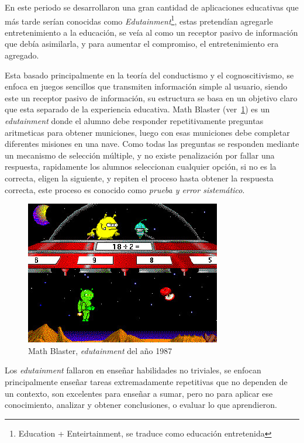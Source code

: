 En este periodo se desarrollaron una gran cantidad de aplicaciones educativas
que más tarde serían conocidas como \emph{Edutainment}\footnote{Education +
	Enteirtainment, se traduce como educación entretenida}, estas pretendían
agregarle entretenimiento a la educación, se veía al como un receptor pasivo de
información que debía asimilarla, y para aumentar el compromiso, el
entretenimiento era agregado\cite{resnick:2004}.

Esta basado principalmente en la teoría del conductismo y el cognoscitivismo, se
enfoca en juegos sencillos que transmiten información simple al usuario, siendo
este un receptor pasivo de información, su estructura se basa en un objetivo
claro que esta separado de la experiencia educativa\cite{egenfeldt2007third}.
Math Blaster (ver~\ref{fig:math_blaster}) es un \emph{edutainment} donde el
alumno debe responder repetitivamente preguntas aritmeticas para obtener
municiones, luego con esas municiones debe completar diferentes misiones en una
nave\cite{bruckman1999can}. Como todas las preguntas se responden mediante un
mecanismo de selección múltiple, y no existe penalización por fallar una
respuesta, rapidamente los alumnos seleccionan cualquier opción, si no es la
correcta, eligen la siguiente, y repiten el proceso hasta obtener la respuesta
correcta, este proceso es conocido como \emph{prueba y error sistemático}. 

\begin{figure}[h!] 
	\centering 
	\includegraphics[scale=0.5,natwidth=296,natheight=217]{tics/math_blaster.jpg}
	\caption{Math Blaster, \emph{edutainment} del año 1987}
	\label{fig:math_blaster} 
\end{figure}

Los \emph{edutainment} fallaron en enseñar habilidades no triviales, se enfocan
principalmente enseñar tareas extremadamente repetitivas que no dependen de un
contexto\cite{charsky:2010}\cite{egenfeldt2007third}\cite{bruckman1999can}, son
excelentes para enseñar a sumar, pero no para aplicar ese conocimiento, analizar
y obtener conclusiones, o evaluar lo que aprendieron.

